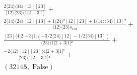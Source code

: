 \documentclass[varwidth, border=5pt]{standalone}
\begin{document}
\begin{my}
$\begin{gathered}
\scriptscriptstyle\frac{2⟨24⟩⟨34⟩[13][23]}{⟨12⟩⟨23⟩⟨1|2+3|1]} +\\
\scriptscriptstyle\frac{2⟨14⟩⟨24⟩[12][13]+1⟨24⟩²[12][23]+1⟨14⟩⟨34⟩[13]²}{⟨12⟩⟨23⟩s_{123}} +\\
\scriptscriptstyle\frac{[23]⟨4|2+3|1](-3/2⟨24⟩[12]-1/2⟨34⟩[13])}{⟨23⟩⟨1|2+3|1]²} +\\
\scriptscriptstyle\frac{-2⟨12⟩[12][23]⟨4|2+3|1]²}{⟨23⟩⟨1|2+3|1]³} +\\
\scriptscriptstyle(3214𝟓,\;\text{False}) \phantom{+}
\end{gathered}$
\end{my}
\end{document}
